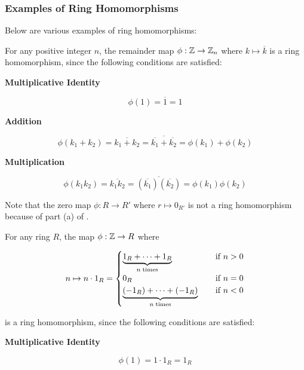 \documentclass[a4paper,12pt]{article}
\begin{document}
\subsubsection{Examples of Ring Homomorphisms}
\begin{exm}
  Below are various examples of ring homomorphisms:

  \begin{alist}
    \item For any positive integer $n$, the remainder map $\phi:\mathbb{Z}\to\mathbb{Z}_{n}$ where $k\mapsto\overline{k}$ is a ring homomorphism, since the following conditions are satisfied:

    \begin{rlist}
      \item \textbf{Multiplicative Identity}

      $$\phi(1)=\overline{1}=1$$

      \item \textbf{Addition}

      $$\phi(k_{1}+k_{2})=\overline{k_{1}+k_{2}}=\overline{\overline{k_{1}}+\overline{k_{2}}}=\phi(k_{1})+\phi(k_{2})$$

      \item \textbf{Multiplication}

      $$\phi(k_{1}k_{2})=\overline{k_{1}k_{2}}=\overline{(\overline{k_{1}})(\overline{k_{2}})}=\phi(k_{1})\phi(k_{2})$$
    \end{rlist}

    Note that the zero map $\phi:R\to R'$ where $r\mapsto 0_{R'}$ is not a ring homomorphism because of part (a) of \rdft[\sctd{3}].

    \item For any ring $R$, the map $\phi:\mathbb{Z}\to R$ where

    $$n\mapsto n\cdot 1_{R}=\begin{cases}
      \underset{n\;\text{times}}{\underbrace{1_{R}+\cdots+1_{R}}}&\;\;\;\;\text{if }n>0\\
      0_{R}&\;\;\;\;\text{if }n=0\\
      \underset{n\;\text{times}}{\underbrace{(-1_{R})+\cdots+(-1_{R})}}&\;\;\;\;\text{if }n<0
    \end{cases}$$\s

    is a ring homomorphism, since the following conditions are satisfied:

    \begin{rlist}
      \item \textbf{Multiplicative Identity}

      $$\phi(1)=1\cdot 1_{R}=1_{R}$$


\end{rlist}
\end{alist}
\end{exm}
\end{document}
